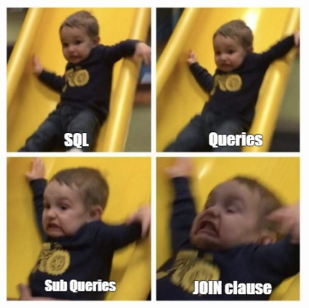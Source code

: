 \documentclass[
	10pt, %
	aspectratio=169, %
]{beamer}
\begin{document}

\begin{frame}
	
	\begin{figure}[h]
		\centering
		\includegraphics[scale=0.5]{mucho.png}
	\end{figure}
	
\end{frame}

\end{document}
